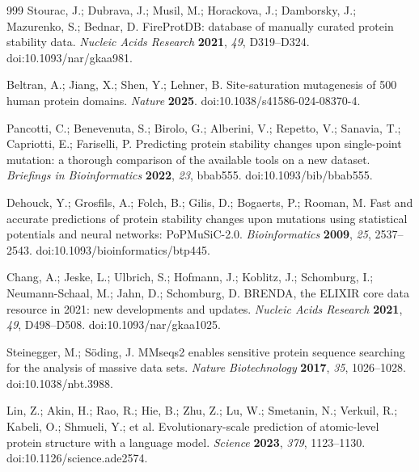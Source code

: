 \documentclass[journal,article,submit,moreauthors]{Definitions/mdpi}
\begin{document}
\begin{thebibliography}{999}
Stourac, J.; Dubrava, J.; Musil, M.; Horackova, J.; Damborsky, J.; Mazurenko, S.; Bednar, D.
FireProtDB: database of manually curated protein stability data. \textit{Nucleic Acids
Research} \textbf{2021}, \textit{49}, D319--D324. doi:10.1093/nar/gkaa981.

Beltran, A.; Jiang, X.; Shen, Y.; Lehner, B. Site-saturation mutagenesis of 500 human
protein domains. \textit{Nature} \textbf{2025}. doi:10.1038/s41586-024-08370-4.

Pancotti, C.; Benevenuta, S.; Birolo, G.; Alberini, V.; Repetto, V.; Sanavia, T.; Capriotti,
E.; Fariselli, P. Predicting protein stability changes upon single-point mutation: a
thorough comparison of the available tools on a new dataset. \textit{Briefings in
Bioinformatics} \textbf{2022}, \textit{23}, bbab555. doi:10.1093/bib/bbab555.

Dehouck, Y.; Grosfils, A.; Folch, B.; Gilis, D.; Bogaerts, P.; Rooman, M. Fast and accurate
predictions of protein stability changes upon mutations using statistical potentials and
neural networks: PoPMuSiC-2.0. \textit{Bioinformatics} \textbf{2009}, \textit{25},
2537--2543. doi:10.1093/bioinformatics/btp445.

Chang, A.; Jeske, L.; Ulbrich, S.; Hofmann, J.; Koblitz, J.; Schomburg, I.; Neumann-Schaal,
M.; Jahn, D.; Schomburg, D. BRENDA, the ELIXIR core data resource in 2021: new developments
and updates. \textit{Nucleic Acids Research} \textbf{2021}, \textit{49}, D498--D508.
doi:10.1093/nar/gkaa1025.

Steinegger, M.; S\"{o}ding, J. MMseqs2 enables sensitive protein sequence searching for the
analysis of massive data sets. \textit{Nature Biotechnology} \textbf{2017}, \textit{35},
1026--1028. doi:10.1038/nbt.3988.

Lin, Z.; Akin, H.; Rao, R.; Hie, B.; Zhu, Z.; Lu, W.; Smetanin, N.; Verkuil, R.; Kabeli, O.;
Shmueli, Y.; et al. Evolutionary-scale prediction of atomic-level protein structure with a
language model. \textit{Science} \textbf{2023}, \textit{379}, 1123--1130.
doi:10.1126/science.ade2574.


\end{thebibliography}
\end{document}
